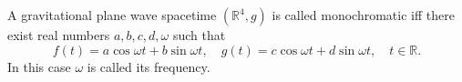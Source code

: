 A gravitational plane wave spacetime $(\mathbb{R}^4, g)$ is called monochromatic iff there exist real numbers $a,b,c,d,\omega$ such that
$$f(t) = a\cos \omega t + b\sin \omega t, \quad g(t) = c\cos \omega t + d\sin \omega t, \quad t \in \mathbb{R}.$$
In this case $\omega$ is called its frequency.
